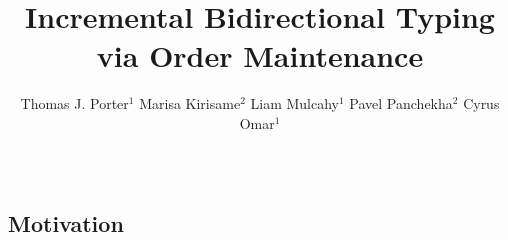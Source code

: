 \documentclass[acmsmall,dvipsnames,10pt,nonacm,sigplan]{acmart}\settopmatter{printfolios=true}
\begin{document}
\title[Incremental]{Incremental Bidirectional Typing via Order Maintenance}






\author{
    Thomas J. Porter$^1$\quad 
    Marisa Kirisame$^2$\quad 
    Liam Mulcahy$^1$\quad 
    Pavel Panchekha$^2$\quad 
    Cyrus Omar$^1$
    \\
    ~\vspace{-7px}\\
    }



\maketitle



\subsection*{Motivation} 
\end{document}
